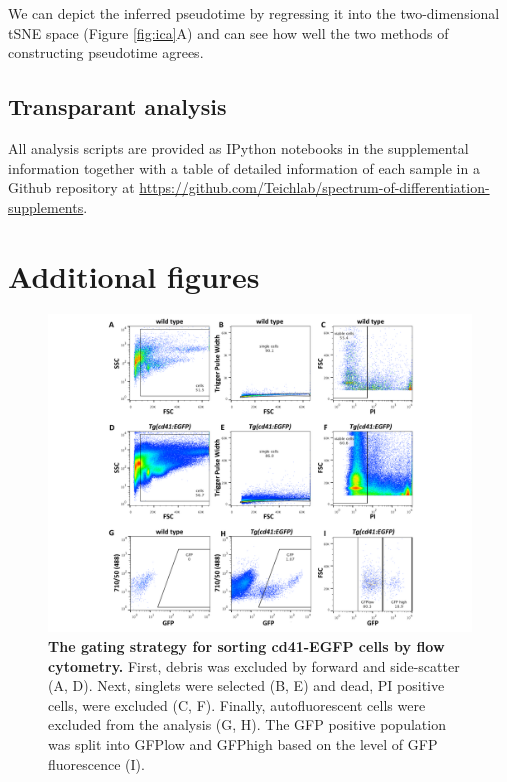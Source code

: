We can depict the inferred pseudotime by regressing it into the two-dimensional tSNE space (Figure \ref{fig:ica}A) and can see how well the two methods of constructing pseudotime agrees.

\subsection{Transparant analysis}

All analysis scripts are provided as IPython notebooks in the supplemental information together with a table of detailed information of each sample in a Github repository at \url{https://github.com/Teichlab/spectrum-of-differentiation-supplements}.

\section{Additional figures}

\begin{figure}
    \centering
    \includegraphics[width=\textwidth]{"SF1"}
    \caption[The gating strategy for sorting cd41-EGFP cells by flow cytometry]{\textbf{The gating strategy for sorting cd41-EGFP cells by flow cytometry.} First, debris was excluded by forward and side-scatter (A, D). Next, singlets were selected (B, E) and dead, PI positive cells, were excluded (C, F). Finally, autofluorescent cells were excluded from the analysis (G, H). The GFP positive population was split into GFPlow and GFPhigh based on the level of GFP fluorescence (I).}
    \label{fig:gating}
\end{figure}

